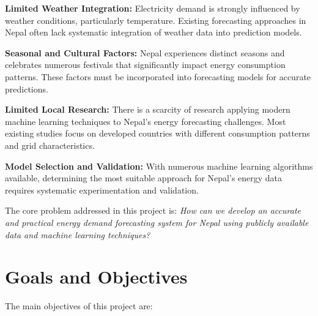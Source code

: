         \textbf{Limited Weather Integration:} Electricity demand is strongly influenced by weather conditions, particularly temperature. Existing forecasting approaches in Nepal often lack systematic integration of weather data into prediction models.

        \textbf{Seasonal and Cultural Factors:} Nepal experiences distinct seasons and celebrates numerous festivals that significantly impact energy consumption patterns. These factors must be incorporated into forecasting models for accurate predictions.

        \textbf{Limited Local Research:} There is a scarcity of research applying modern machine learning techniques to Nepal's energy forecasting challenges. Most existing studies focus on developed countries with different consumption patterns and grid characteristics.

        \textbf{Model Selection and Validation:} With numerous machine learning algorithms available, determining the most suitable approach for Nepal's energy data requires systematic experimentation and validation.

        The core problem addressed in this project is: \textit{How can we develop an accurate and practical energy demand forecasting system for Nepal using publicly available data and machine learning techniques?}

    \pagebreak
    \section{Goals and Objectives}
        The main objectives of this project are:

